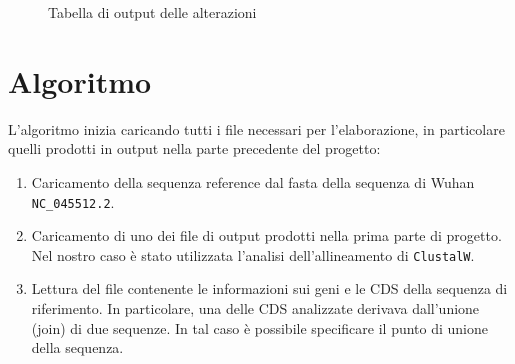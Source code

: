 \documentclass[11pt,italian]{article}
\begin{document}
\begin{figure}
  \caption{Tabella di output delle alterazioni}
  \label{fig:alteration_table}
\end{figure}

\newpage
\section{Algoritmo}
L'algoritmo inizia caricando tutti i file necessari per l'elaborazione, in particolare quelli prodotti in output nella parte precedente del progetto:
\begin{enumerate}
  \item Caricamento della sequenza reference dal fasta della sequenza di Wuhan \lstinline{NC_045512.2}.
  \item Caricamento di uno dei file di output prodotti nella prima parte di progetto. Nel nostro caso è stato utilizzata l'analisi dell'allineamento di \lstinline{ClustalW}.
  \item Lettura del file contenente le informazioni sui geni e le CDS della sequenza di riferimento. In particolare, una delle CDS analizzate derivava dall'unione (join) di due sequenze. In tal caso è possibile specificare il punto di unione della sequenza.
\end{enumerate}
\end{document}
